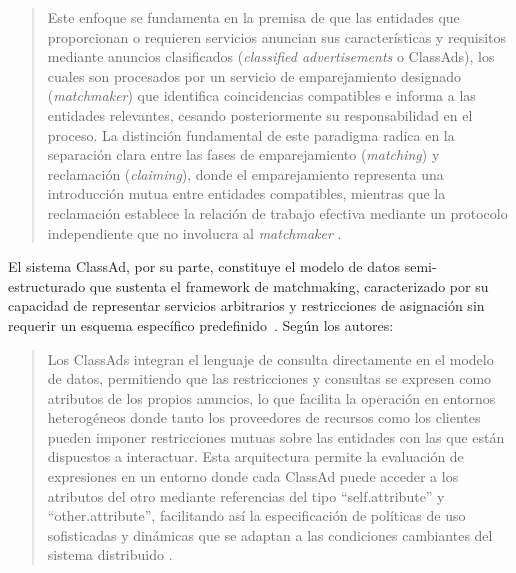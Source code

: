 \begin{quote}
	Este enfoque se fundamenta en la premisa de que las entidades que proporcionan o requieren servicios anuncian sus características y requisitos mediante anuncios clasificados (\textit{classified advertisements} o ClassAds), los cuales son procesados por un servicio de emparejamiento designado (\textit{matchmaker}) que identifica coincidencias compatibles e informa a las entidades relevantes, cesando posteriormente su responsabilidad en el proceso. La distinción fundamental de este paradigma radica en la separación clara entre las fases de emparejamiento (\textit{matching}) y reclamación (\textit{claiming}), donde el emparejamiento representa una introducción mutua entre entidades compatibles, mientras que la reclamación establece la relación de trabajo efectiva mediante un protocolo independiente que no involucra al \textit{matchmaker} \citep{Raman1998}.
\end{quote}

\noindent
El sistema ClassAd, por su parte, constituye el modelo de datos semi-estructurado que sustenta el framework de matchmaking, caracterizado por su capacidad de representar servicios arbitrarios y restricciones de asignación sin requerir un esquema específico predefinido~\cite{Raman1998}. Según los autores:
\begin{quote}
	Los ClassAds integran el lenguaje de consulta directamente en el modelo de datos, permitiendo que las restricciones y consultas se expresen como atributos de los propios anuncios, lo que facilita la operación en entornos heterogéneos donde tanto los proveedores de recursos como los clientes pueden imponer restricciones mutuas sobre las entidades con las que están dispuestos a interactuar. Esta arquitectura permite la evaluación de expresiones en un entorno donde cada ClassAd puede acceder a los atributos del otro mediante referencias del tipo ``self.attribute'' y ``other.attribute'', facilitando así la especificación de políticas de uso sofisticadas y dinámicas que se adaptan a las condiciones cambiantes del sistema distribuido \cite{Raman1998}.
\end{quote}


